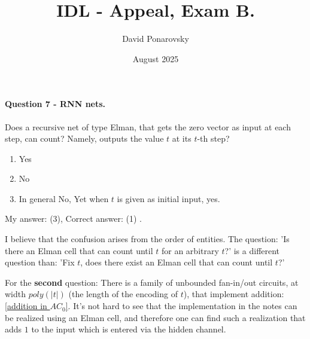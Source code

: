 \documentclass{article}
\title{IDL - Appeal, Exam B. }
\author{David Ponarovsky}
\date{August 2025}
\newcommand{\inb}[1]{ \color{blue}#1 \color{black} }
\begin{document}
\maketitle

\paragraph{ Question 7 - RNN nets.} 
Does a recursive net of type Elman, that gets the zero vector as input at each step, can count? Namely, outputs the value $t$ at its $t$-th step?
\begin{enumerate}
  \item Yes
  \item No
  \item In general No, Yet when $t$ is given as initial input, yes. 
\end{enumerate}
\inb{ My answer: (3), Correct answer: (1)}. 




I believe that the confusion arises from the order of entities. The question: 'Is there an Elman cell that can count until $t$ for an arbitrary $t$?' is a different question than: 'Fix $t$, does there exist an Elman cell that can count until $t$?'

For the \textbf{second} question: There is a family of unbounded fan-in/out circuits, at width $poly(|t|)$ (the length of the encoding of $t$), that implement addition: \href{https://people.clarkson.edu/~alexis/PCMI/Notes/lectureB02.pdf}{[addition in $AC_{0}$]}. It's not hard to see that the implementation in the notes can be realized using an Elman cell, and therefore one can find such a realization that adds $1$ to the input which is entered via the hidden channel.
\end{document}
